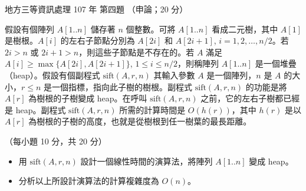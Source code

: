 \begin{pastexam}[label={px:df3-107-ds-04}]{地方三等資訊處理 107 年 第四題}
（申論；20 分）

假設有個陣列 $A[1..n]$ 儲存著 $n$ 個整數。可將 $A[1..n]$ 看成二元樹，其中 $A[1]$ 是樹根。$A[i]$ 的左右子節點分別為 $A[2i]$ 和 $A[2i+1]$, $i=1, 2, \ldots, n/2$。若 $2i>n$ 或 $2i+1>n$，則這些子節點是不存在的。若 $A$ 滿足 $A[i] \ge \max\{A[2i], A[2i+1]\}$, $1 \le i \le n/2$，則稱陣列 $A[1..n]$ 是一個堆疊（heap）。假設有個副程式 $\mathrm{sift}(A, r, n)$ 其輸入參數 $A$ 是一個陣列，$n$ 是 $A$ 的大小，$r \le n$ 是一個指標，指向此子樹的樹根。副程式 $\mathrm{sift}(A, r, n)$ 的功能是將 $A[r]$ 為樹根的子樹變成 heap。在呼叫 $\mathrm{sift}(A, r, n)$ 之前，它的左右子樹都已經是 heap。副程式 $\mathrm{sift}(A, r, n)$ 所需的計算時間是 $O(h(r))$，其中 $h(r)$ 是以 $A[r]$ 為樹根的子樹的高度，也就是從樹根到任一樹葉的最長距離。

（每小題 10 分，共 20 分）
\begin{itemize}[leftmargin=2.2em]
\item[㈠] 用 $\mathrm{sift}(A, r, n)$ 設計一個線性時間的演算法，將陣列 $A[1..n]$ 變成 heap。
\item[㈡] 分析以上所設計演算法的計算複雜度為 $O(n)$。
\end{itemize}
\end{pastexam}

